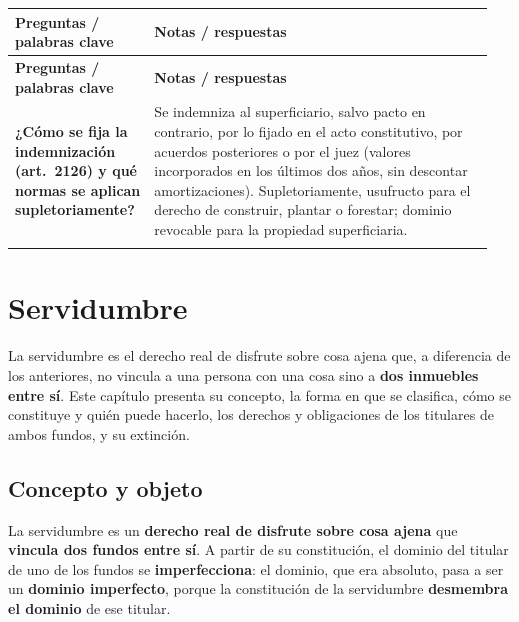 \documentclass[12pt,oneside]{book}
\makeatletter
\newenvironment{cornell}{%
    \par\vspace{0.5em}
    \noindent
    \begin{longtable}{@{}>{\raggedright\arraybackslash}p{0.27\linewidth}
                         >{\raggedright\arraybackslash}p{0.68\linewidth}@{}}
    \toprule
    \textbf{Preguntas / palabras clave} & \textbf{Notas / respuestas} \\
    \midrule
    \endfirsthead
    \toprule
    \textbf{Preguntas / palabras clave} & \textbf{Notas / respuestas} \\
    \midrule
    \endhead
}{%
    \bottomrule
    \end{longtable}
}
\newcommand{\cornellsummary}[1]{%
    \midrule
    \multicolumn{2}{@{}p{\dimexpr0.95\linewidth+2\tabcolsep\relax}@{}}{%
        \vspace{0.2em}\textbf{Resumen:} #1\vspace{0.2em}} \\
}
\makeatother
\begin{document}
\begin{cornell}
\textbf{¿Cómo se fija la indemnización (art.~2126) y qué normas se aplican supletoriamente?} &
Se indemniza al superficiario, salvo pacto en contrario, por lo fijado en el acto constitutivo, por acuerdos posteriores o por el juez (valores incorporados en los últimos dos años, sin descontar amortizaciones). Supletoriamente, usufructo para el derecho de construir, plantar o forestar; dominio revocable para la propiedad superficiaria. \\

\cornellsummary{La superficie, regulada en los arts.~2114 a 2126, separa la propiedad del suelo de la de lo construido, plantado o forestado. Admite dos modalidades según su objeto y se adquiere por título y modo, nunca por prescripción, con escritura pública e inscripción para su oponibilidad. El superficiario posee, puede gravar y transmitir su derecho; el propietario conserva un dominio imperfecto. Se extingue por vencimiento, renuncia, condición resolutoria, consolidación o no uso; la destrucción del objeto no la extingue de inmediato. Al extinguirse, el propietario adquiere lo edificado o plantado y debe indemnizar al superficiario, salvo pacto en contrario.}
\end{cornell}

\chapter{Servidumbre}\label{cap:servidumbre}

La servidumbre es el derecho real de disfrute sobre cosa ajena que, a diferencia de los anteriores, no vincula a una persona con una cosa sino a \textbf{dos inmuebles entre sí}. Este capítulo presenta su concepto, la forma en que se clasifica, cómo se constituye y quién puede hacerlo, los derechos y obligaciones de los titulares de ambos fundos, y su extinción.

\section{Concepto y objeto}

La servidumbre es un \textbf{derecho real de disfrute sobre cosa ajena} que \textbf{vincula dos fundos entre sí}. A partir de su constitución, el dominio del titular de uno de los fundos se \textbf{imperfecciona}: el dominio, que era absoluto, pasa a ser un \textbf{dominio imperfecto}, porque la constitución de la servidumbre \textbf{desmembra el dominio} de ese titular.
\end{document}
